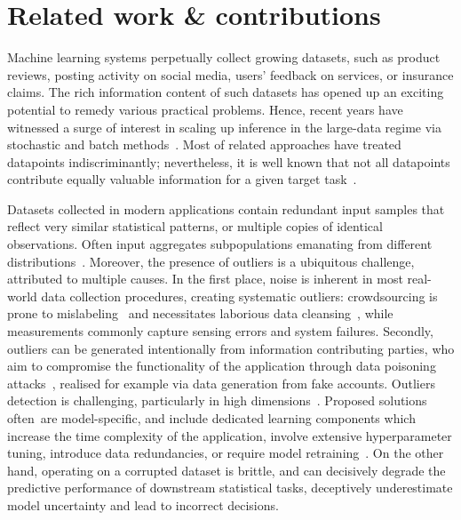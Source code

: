 \section{Related work \& contributions}
\label{sec:introduction}

Machine learning systems perpetually collect growing datasets, such as product reviews, posting activity on social media, users' feedback on services, or insurance claims. The rich information content of such datasets has opened up an exciting potential to remedy various practical problems. Hence, recent years have witnessed a surge of interest in scaling up inference in the large-data regime via stochastic and batch methods~\citep{angelino16, hoffman13, welling11}. Most of related approaches have treated datapoints indiscriminantly; nevertheless, it is well known that not all datapoints contribute equally valuable information for a given target task~\citep{ghorbani19}. 

Datasets collected in modern applications contain redundant input samples that reflect very similar statistical patterns, or multiple copies of identical observations. Often input aggregates subpopulations emanating from different distributions~\citep{zheng08, zhuang15}. Moreover, the presence of outliers is a ubiquitous challenge, attributed to multiple causes. In the first place, noise is inherent in most real-world data collection procedures, creating systematic outliers: crowdsourcing is prone to mislabeling~\citep{frenay13} and necessitates laborious data cleansing~\citep{lewis04, paschou10}, while measurements commonly capture sensing errors and system failures. Secondly, outliers can be generated intentionally from information contributing parties, who aim to compromise the functionality of the application through data poisoning attacks~\citep{barreno10, biggio12, li16, koh17, steinhardt17, ghorbani19}, realised for example via data generation from fake accounts. Outliers detection is  challenging, particularly in high dimensions~\citep{lucic16outliers, diakonikolas19, dickens20}. Proposed solutions \mbox{often are} model-specific, and include dedicated learning components which increase the time complexity of the application, involve extensive hyperparameter tuning, introduce data redundancies, or require model retraining~\citep{sheng08, whitehill09, raykar10, karger11, liu12, zhang16}. On the other hand, operating on a corrupted dataset is brittle, and can decisively degrade the predictive performance of downstream statistical tasks, deceptively underestimate model uncertainty and lead to incorrect decisions. 

